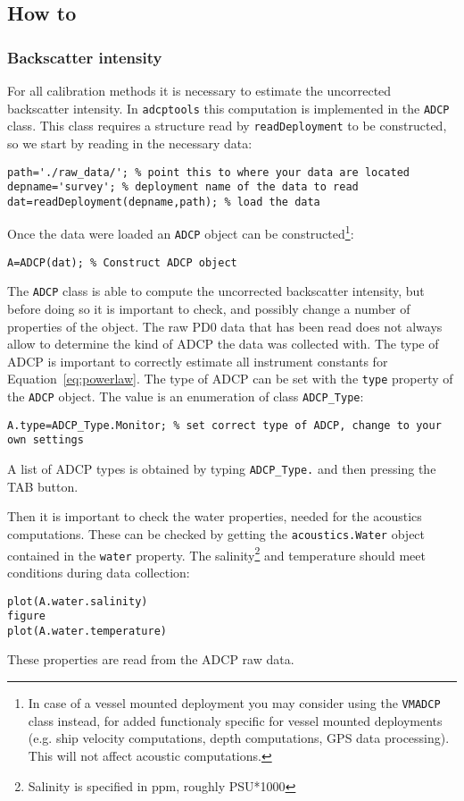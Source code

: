 \documentclass[]{article}
\begin{document}
\subsection{How to}
\label{sec:general_howto}
\subsubsection{Backscatter intensity}
For all calibration methods it is necessary to estimate the uncorrected backscatter intensity. In \lstinline!adcptools! this computation is implemented in the \lstinline!ADCP! class. This class requires a structure read by \lstinline!readDeployment! to be constructed, so we start by reading in the necessary data:
\begin{lstlisting}
path='./raw_data/'; % point this to where your data are located
depname='survey'; % deployment name of the data to read
dat=readDeployment(depname,path); % load the data
\end{lstlisting}

Once the data were loaded an \lstinline!ADCP! object can be constructed\footnote{In case of a vessel mounted deployment you may consider using the \lstinline!VMADCP! class instead, for added functionaly specific for vessel mounted deployments (e.g. ship velocity computations, depth computations, GPS data processing). This will not affect acoustic computations.}:
\begin{lstlisting}
A=ADCP(dat); % Construct ADCP object
\end{lstlisting}


The \lstinline!ADCP! class is able to compute the uncorrected backscatter intensity, but before doing so it is important to check, and possibly change a number of properties of the object.
The raw PD0 data that has been read does not always allow to determine the kind of ADCP the data was collected with. The type of ADCP is important to correctly estimate all instrument constants for Equation~\ref{eq:powerlaw}. The type of ADCP can be set with the \lstinline!type! property of the \lstinline!ADCP! object. The value is an enumeration of class \lstinline!ADCP_Type!: 
\begin{lstlisting}
A.type=ADCP_Type.Monitor; % set correct type of ADCP, change to your own settings
\end{lstlisting}
A list of ADCP types is obtained by typing \lstinline!ADCP_Type.! and then pressing the TAB button.

Then it is important to check the water properties, needed for the acoustics computations. These can be checked by getting the \lstinline!acoustics.Water! object contained in the \lstinline!water! property. The salinity\footnote{Salinity is specified in ppm, roughly PSU*1000} and temperature should meet conditions during data collection: 
\begin{lstlisting}
plot(A.water.salinity)
figure
plot(A.water.temperature)
\end{lstlisting}
These properties are read from the ADCP raw data.
\end{document}
